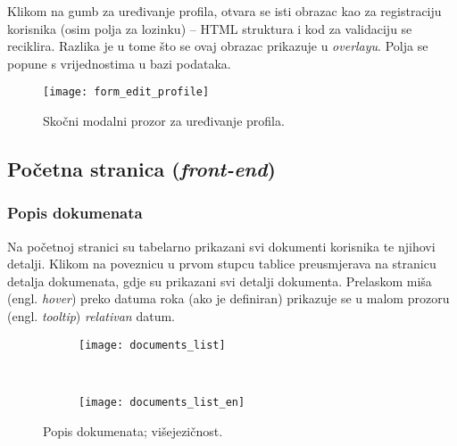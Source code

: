     Klikom na gumb za uređivanje profila, otvara se isti obrazac kao za
    registraciju korisnika (osim polja za lozinku) -- HTML struktura i kod za
    validaciju se reciklira. Razlika je u tome što se ovaj obrazac prikazuje u
    \textit{overlayu}. Polja se popune s vrijednostima u bazi podataka.

    \begin{figure}[h]
      \centering
      \texttt{[image: form\_edit\_profile]}
      \caption{Skočni modalni prozor za uređivanje profila.}
    \end{figure}

  \subsection{Početna stranica (\textit{front-end})}

    \subsubsection{Popis dokumenata}

      Na početnoj stranici su tabelarno prikazani svi dokumenti korisnika te
      njihovi detalji. Klikom na poveznicu u prvom stupcu tablice preusmjerava na
      stranicu detalja dokumenata, gdje su prikazani svi detalji dokumenta.
      Prelaskom miša (engl. \textit{hover}) preko datuma roka (ako je definiran)
      prikazuje se u malom prozoru (engl. \textit{tooltip}) \textit{relativan}
      datum.

      \begin{figure}[h]
        \centering
        \begin{subfigure}{\textwidth}
          \texttt{[image: documents\_list]}
        \end{subfigure}
        \\
        \begin{subfigure}{\textwidth}
          \texttt{[image: documents\_list\_en]}
        \end{subfigure}

        \caption{Popis dokumenata; višejezičnost.}
      \end{figure}
